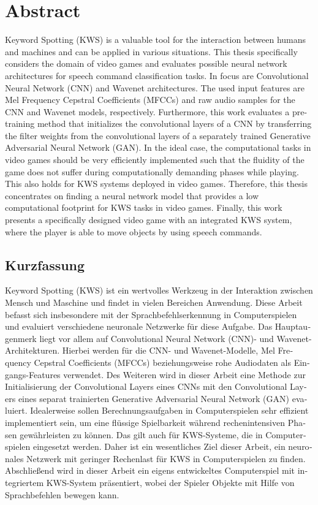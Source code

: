 
\chapter*{Abstract}\label{sec:shards_abstract}
Keyword Spotting (KWS) is a valuable tool for the interaction between humans and machines and can be applied in various situations.
This thesis specifically considers the domain of video games and evaluates possible neural network architectures for speech command classification tasks.
In focus are Convolutional Neural Network (CNN) and Wavenet architectures.
The used input features are Mel Frequency Cepstral Coefficients (MFCCs) and raw audio samples for the CNN and Wavenet models, respectively.
Furthermore, this work evaluates a pre-training method that initializes the convolutional layers of a CNN by transferring the filter weights from the convolutional layers of a separately trained Generative Adversarial Neural Network (GAN).
In the ideal case, the computational tasks in video games should be very efficiently implemented such that the fluidity of the game does not suffer during computationally demanding phases while playing.
This also holds for KWS systems deployed in video games.
Therefore, this thesis concentrates on finding a neural network model that provides a low computational footprint for KWS tasks in video games.
Finally, this work presents a specifically designed video game with an integrated KWS system, where the player is able to move objects by using speech commands.



\begin{otherlanguage}{ngerman}
\chapter*{Kurzfassung}
Keyword Spotting (KWS) ist ein wertvolles Werkzeug in der Interaktion zwischen Mensch und Maschine und findet in vielen Bereichen Anwendung.
Diese Arbeit befasst sich insbesondere mit der Sprachbefehlserkennung in Computerspielen und evaluiert verschiedene neuronale Netzwerke für diese Aufgabe.
Das Hauptaugenmerk liegt vor allem auf Convolutional Neural Network (CNN)- und Wavenet-Architekturen.
Hierbei werden für die CNN- und Wavenet-Modelle, Mel Frequency Cepstral Coefficients (MFCCs) beziehungsweise rohe Audiodaten als Eingangs-Features verwendet.
Des Weiteren wird in dieser Arbeit eine Methode zur Initialisierung der Convolutional Layers eines CNNs mit den Convolutional Layers eines separat trainierten Generative Adversarial Neural Network (GAN) evaluiert.
Idealerweise sollen Berechnungsaufgaben in Computerspielen sehr effizient implementiert sein, um eine flüssige Spielbarkeit während rechenintensiven Phasen gewährleisten zu können.
Das gilt auch für KWS-Systeme, die in Computerspielen eingesetzt werden.
Daher ist ein wesentliches Ziel dieser Arbeit, ein neuronales Netzwerk mit geringer Rechenlast für KWS in Computerspielen zu finden.
Abschließend wird in dieser Arbeit ein eigens entwickeltes Computerspiel mit integriertem KWS-System präsentiert, wobei der Spieler Objekte mit Hilfe von Sprachbefehlen bewegen kann.
\end{otherlanguage}